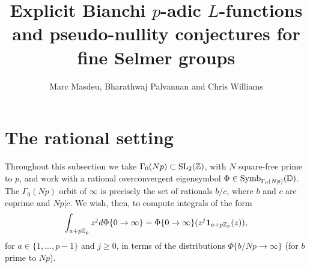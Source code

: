 \documentclass[a4paper,11pt]{article}
\title{Explicit Bianchi $p$-adic $L$-functions and pseudo-nullity conjectures for fine Selmer groups}
\author{Marc Masdeu, Bharathwaj Palvannan and Chris Williams}
\date{}
\numberwithin{equation}{section}
\begin{document}
%
%

\maketitle



\section{The rational setting}
Throughout this subsection we take $\Gamma_0(Np) \subset \mathrm{SL}_2(\mathbb{Z})$, with $N$ square-free prime to $p$, and work with a rational overconvergent eigensymbol $\Phi \in \mathrm{Symb}_{\Gamma_0(Np)}(\mathbb{D})$. The $\Gamma_0(Np)$ orbit of $\infty$ is precisely the set of rationals $b/c$, where $b$ and $c$ are coprime and $Np|c$. We wish, then, to compute integrals of the form
\[
 \int_{a+p\mathbb{Z}_p}z^j d\Phi\{0\rightarrow\infty\} = \Phi\{0\rightarrow\infty\}(z^j\mathbf{1}_{a+p\mathbb{Z}_p}(z)),
\]
for $a \in \{1,...,p-1\}$ and $j \geq 0$, in terms of the distributions $\Phi\{b/Np\rightarrow\infty\}$ (for $b$ prime to $Np$).
\end{document}
